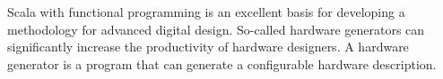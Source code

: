 \documentclass[fleqn,12pt]{article}
\newcommand{\todo}[1]{{\it TODO: #1}}
\begin{document}
Scala with functional programming is an excellent basis for developing a methodology for
advanced digital design.
So-called hardware generators can significantly increase the productivity of hardware designers.
A hardware generator is a program that can generate a configurable
hardware description.








%
%
%
%
\end{document}
